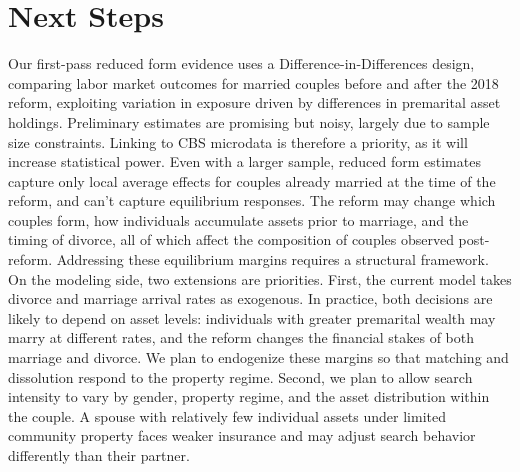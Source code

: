 \documentclass[11pt]{article}
\begin{document}
\section*{Next Steps}

Our first-pass reduced form evidence uses a Difference-in-Differences design, comparing labor market outcomes for married couples before and after the 2018 reform, exploiting variation in exposure driven by differences in premarital asset holdings. Preliminary estimates are promising but noisy, largely due to sample size constraints. Linking to CBS microdata is therefore a priority, as it will increase statistical power. Even with a larger sample, reduced form estimates capture only local average effects for couples already married at the time of the reform, and can't capture equilibrium responses. The reform may change which couples form, how individuals accumulate assets prior to marriage, and the timing of divorce, all of which affect the composition of couples observed post-reform. Addressing these equilibrium margins requires a structural framework. On the modeling side, two extensions are priorities. First, the current model takes divorce and marriage arrival rates as exogenous. In practice, both decisions are likely to depend on asset levels: individuals with greater premarital wealth may marry at different rates, and the reform changes the financial stakes of both marriage and divorce. We plan to endogenize these margins so that matching and dissolution respond to the property regime. Second, we plan to allow search intensity to vary by gender, property regime, and the asset distribution within the couple. A spouse with relatively few individual assets under limited community property faces weaker insurance and may adjust search behavior differently than their partner. 


\end{document}
